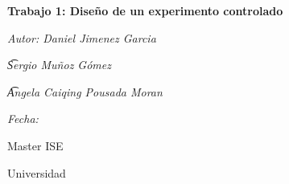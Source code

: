\documentclass[a4paper,12pt]{article}
\begin{document}
\begin{titlepage}
    \centering
    \vspace*{3cm}
    {\Huge\bfseries Trabajo 1: Diseño de un experimento controlado \par}
    \vspace{2cm}
    {\Large\itshape Autor: Daniel Jimenez Garcia \par}
    {\Large\itshape \t Sergio Muñoz Gómez \par}
    {\Large\itshape \t Angela Caiqing Pousada Moran \par}
    \vspace{1cm}
    {\Large\itshape Fecha: \underline{\hspace{6cm}} \par}
    \vfill
    {\large Master ISE \par}
    {\large Universidad \par}
\end{titlepage}
\end{document}
